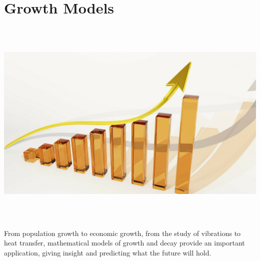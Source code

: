 \documentclass[9pt,letter,twoside,openright]{memoir}
\begin{document}

\setcounter{chapter}{1}
\setcounter{page}{57}
\chapter{Growth Models}
\begin{center}\includegraphics[width=\textwidth, height=4in]{Growth1}\end{center}
From population growth to economic growth, from the study of vibrations to heat transfer, mathematical models of growth and decay provide an important application, giving insight and predicting what the future will hold.
\end{document}
